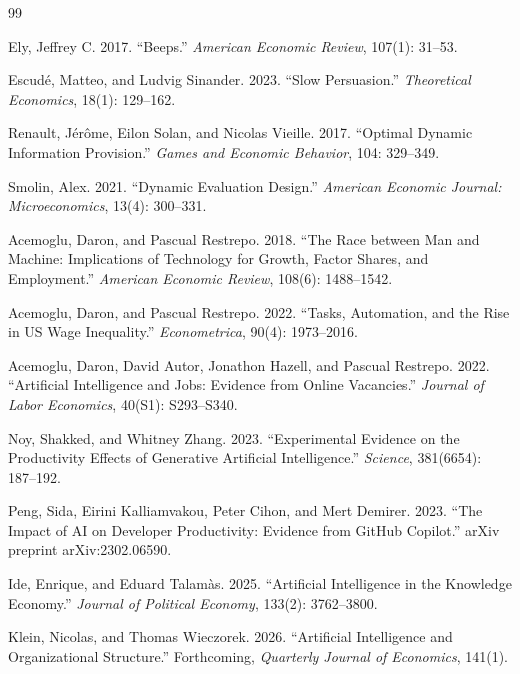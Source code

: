 \begin{thebibliography}{99}

Ely, Jeffrey C. 2017.
``Beeps.''
\textit{American Economic Review}, 107(1): 31--53.

Escud{\'e}, Matteo, and Ludvig Sinander. 2023.
``Slow Persuasion.''
\textit{Theoretical Economics}, 18(1): 129--162.

Renault, J{\'e}r{\^o}me, Eilon Solan, and Nicolas Vieille. 2017.
``Optimal Dynamic Information Provision.''
\textit{Games and Economic Behavior}, 104: 329--349.

Smolin, Alex. 2021.
``Dynamic Evaluation Design.''
\textit{American Economic Journal: Microeconomics}, 13(4): 300--331.

Acemoglu, Daron, and Pascual Restrepo. 2018.
``The Race between Man and Machine: Implications of Technology for Growth, Factor Shares, and Employment.''
\textit{American Economic Review}, 108(6): 1488--1542.

Acemoglu, Daron, and Pascual Restrepo. 2022.
``Tasks, Automation, and the Rise in US Wage Inequality.''
\textit{Econometrica}, 90(4): 1973--2016.

Acemoglu, Daron, David Autor, Jonathon Hazell, and Pascual Restrepo. 2022.
``Artificial Intelligence and Jobs: Evidence from Online Vacancies.''
\textit{Journal of Labor Economics}, 40(S1): S293--S340.

Noy, Shakked, and Whitney Zhang. 2023.
``Experimental Evidence on the Productivity Effects of Generative Artificial Intelligence.''
\textit{Science}, 381(6654): 187--192.

Peng, Sida, Eirini Kalliamvakou, Peter Cihon, and Mert Demirer. 2023.
``The Impact of AI on Developer Productivity: Evidence from GitHub Copilot.''
arXiv preprint arXiv:2302.06590.

Ide, Enrique, and Eduard Talam{\`a}s. 2025.
``Artificial Intelligence in the Knowledge Economy.''
\textit{Journal of Political Economy}, 133(2): 3762--3800.

Klein, Nicolas, and Thomas Wieczorek. 2026.
``Artificial Intelligence and Organizational Structure.''
Forthcoming, \textit{Quarterly Journal of Economics}, 141(1).

\end{thebibliography}

